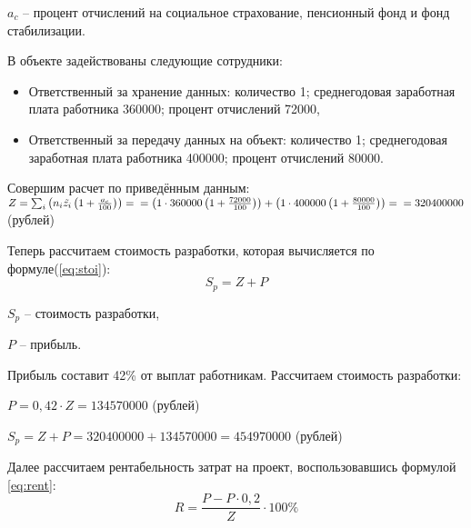 $a_{c}$ -- процент отчислений на социальное страхование, пенсионный фонд и фонд стабилизации.

В объекте задействованы следующие сотрудники:
\begin{itemize}
    \item Ответственный за хранение данных: количество 1; среднегодовая заработная плата работника 360000; процент отчислений 72000,
    \item Ответственный за передачу данных на объект: количество 1; среднегодовая заработная плата работника 400000; процент отчислений 80000.
\end{itemize}
Совершим расчет по приведённым данным:\\
$Z = \sum_{i}^{}{\left(n_{i}\tilde{z_{i}}\left(1+\frac{a_{c}}{100} \right) \right)} = \\ = \left( 1\cdot 360000 \left(1+\frac{72000}{100} \right)\right) + \left( 1\cdot 400000 \left(1+\frac{80000}{100} \right)\right) = \\ = 320400000$(рублей)

Теперь рассчитаем  стоимость разработки, которая вычисляется по формуле(\ref{eq:stoi}):
\begin{equation}\label{eq:stoi}
S_{p} = Z + P
\end{equation}

$S_{p}$ -- стоимость разработки,

$P$ -- прибыль.

Прибыль составит 42\% от выплат работникам. Рассчитаем стоимость разработки:
\begin{flushleft}
\begin{math}
P = 0,42 \cdot Z = 134570000\end{math} (рублей)\end{flushleft}
\begin{flushleft}
\begin{math}
S_{p} = Z + P = 320400000 + 134570000 = 454970000
\end{math} (рублей)\end{flushleft}

Далее рассчитаем рентабельность затрат на проект, воспользовавшись формулой \ref{eq:rent}:
\begin{equation}\label{eq:rent}
R=\frac{P-P \cdot 0,2}{Z} \cdot 100\%
\end{equation}

